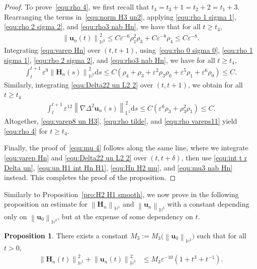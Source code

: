 \documentclass[11pt, reqno]{amsart}
\theoremstyle{definition}
\newtheorem{proposition}[theorem]{Proposition}
\numberwithin{equation}{section}
\newcommand{\bff}{\boldsymbol}
\newcommand{\bb}{\mathbb}
\newcommand{\ds}{\mathrm{d}s}
\newcommand{\norm}[2]{\left\|{#1}\right\|_{#2}}
\begin{document}
\begin{proof}
    To prove~\eqref{equ:rho 4}, we first recall that $t_4=t_3+1=t_2+2=t_1+3$. Rearranging the terms in~\eqref{equ:norm H3 un2}, applying \eqref{equ:rho 1 sigma 1}, \eqref{equ:rho 2 sigma 2}, and \eqref{equ:rho3 nab Hn}, we have that for all $t\geq t_4$,
    \begin{align}\label{equ:varep8 un H3}
        \norm{\bff{u}_n(t)}{\bb{H}^3}^2 \leq
        C \varepsilon^{-6} \rho_1^2 \rho_3 + C\varepsilon^{-8} \rho_4
        \leq
        C\varepsilon^{-8}.
    \end{align}
    Integrating \eqref{equ:varep Hn} over $(t,t+1)$, using~\eqref{equ:rho 0 sigma 0}, \eqref{equ:rho 1 sigma 1}, \eqref{equ:rho 2 sigma 2}, and \eqref{equ:rho3 nab Hn}, we have for all $t\geq t_4$,
    \begin{align}\label{equ:rho tilde}
        \int_t^{t+1} \varepsilon^9 \norm{\bff{H}_n(s)}{\bb{H}^3}^2 \ds
        \leq
        C\left(\rho_4+\rho_3 +\varepsilon^2 \rho_3\rho_0+\varepsilon^5 \rho_1+\varepsilon^6 \rho_0 \right) \leq C.
    \end{align}
    Similarly, integrating \eqref{equ:Delta22 un L2 2} over $(t,t+1)$, we obtain for all $t\geq t_4$
    \begin{align}\label{equ:rho vareps11}
        \int_t^{t+1} \varepsilon^{12} \norm{\nabla\Delta^2 \bff{u}_n (s)}{\bb{L}^2}^2 \ds
        \leq
        C\left( \varepsilon^6 \rho_3 + \rho_3^2 \rho_1 \right)
        \leq C.
    \end{align}
Altogether, \eqref{equ:varep8 un H3}, \eqref{equ:rho tilde}, and \eqref{equ:rho vareps11} yield \eqref{equ:rho 4} for $t\geq t_4$.

Finally, the proof of~\eqref{equ:mu 4} follows along the same line, where we integrate \eqref{equ:varep Hn} and \eqref{equ:Delta22 un L2 2} over $(t,t+\delta)$, then use \eqref{equ:int t r Delta un}, \eqref{equ:un H1 int Hn H1}, \eqref{equ:Hn H2 mu}, and \eqref{equ:mu3 nab Hn} instead. This completes the proof of the proposition.
\end{proof}

Similarly to Proposition~\ref{pro:H2 H1 smooth}, we now prove in the following proposition an estimate for $\norm{\bff{H}_n}{\bb{H}^1}$ and $\norm{\bff{u}_n}{\bb{H}^3}$ with a constant depending only on $\norm{\bff{u}_0}{\bb{H}^2}$, but at the expense of some dependency on $t$.

\begin{proposition}\label{pro:Hn H1}
There exists a constant $M_3:=M_3\big(\norm{\bff{u}_0}{\bb{H}^2}\big)$ such that for all $t>0$,
\begin{align*}
    \norm{\bff{H}_n(t)}{\bb{H}^1}^2
    +
    \norm{\bff{u}_n(t)}{\bb{H}^3}^2
    &\leq
    M_3 \varepsilon^{-10} (1+t^3+t^{-1}).
\end{align*}
\end{proposition}
\end{document}
